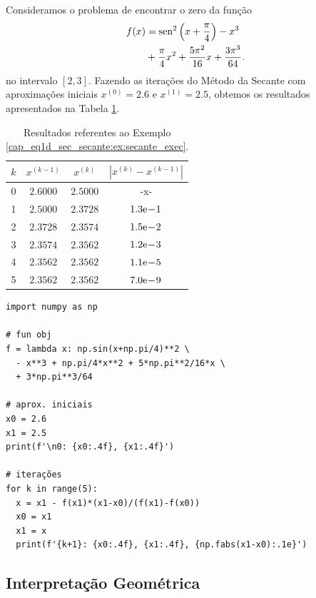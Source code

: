 \begin{ex}\label{ex:secante_exec}
  Consideramos o problema de encontrar o zero da função
  \begin{equation}
    \begin{aligned}
      f(x) &= \operatorname{sen}^2\left(x+\frac{\pi}{4}\right) - x^3 \\
      &+ \frac{\pi}{4}x^2 + \frac{5\pi^2}{16}x + \frac{3\pi^3}{64}.
    \end{aligned}
  \end{equation}
  no intervalo $[2, 3]$. Fazendo as iterações do Método da Secante com aproximações iniciais $x^{(0)}=2.6$ e $x^{(1)}=2.5$, obtemos os resultados apresentados na Tabela \ref{cap_eq1d_sec_secante:tab:ex_secante_exec}.

\begin{table}[h!]
  \centering
  \caption{Resultados referentes ao Exemplo \ref{cap_eq1d_sec_secante:ex:secante_exec}.}
  \label{cap_eq1d_sec_secante:tab:ex_secante_exec}
  \begin{tabular}{r|ccc}
    $k$ & $x^{(k-1)}$ & $x^{(k)}$ & $|x^{(k)}-x^{(k-1)}|$ \\\hline
    0 & $2.6000$ & $2.5000$ & -x-\\
    1 & $2.5000$ & $2.3728$ & $1.3\mathrm{e}\!-\!1$ \\
    2 & $2.3728$ & $2.3574$ & $1.5\mathrm{e}\!-\!2$ \\
    3 & $2.3574$ & $2.3562$ & $1.2\mathrm{e}\!-\!3$ \\
    4 & $2.3562$ & $2.3562$ & $1.1\mathrm{e}\!-\!5$ \\
    5 & $2.3562$ & $2.3562$ & $7.0\mathrm{e}\!-\!9$ \\\hline
  \end{tabular}
\end{table}

\begin{lstlisting}
import numpy as np

# fun obj
f = lambda x: np.sin(x+np.pi/4)**2 \
  - x**3 + np.pi/4*x**2 + 5*np.pi**2/16*x \
  + 3*np.pi**3/64

# aprox. iniciais
x0 = 2.6
x1 = 2.5
print(f'\n0: {x0:.4f}, {x1:.4f}')

# iterações
for k in range(5):
  x = x1 - f(x1)*(x1-x0)/(f(x1)-f(x0))
  x0 = x1
  x1 = x
  print(f'{k+1}: {x0:.4f}, {x1:.4f}, {np.fabs(x1-x0):.1e}')
\end{lstlisting}

\end{ex}

\subsection{Interpretação Geométrica}


